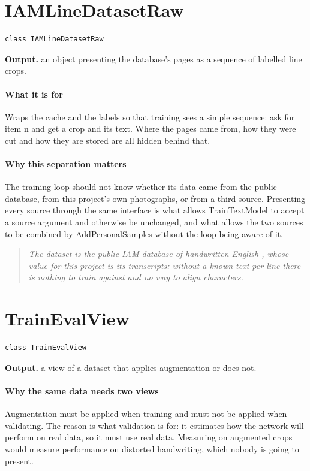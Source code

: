 \section{IAMLineDatasetRaw}
\begin{lstlisting}[style=sig]
class IAMLineDatasetRaw
\end{lstlisting}

\noindent\textbf{Output.} an object presenting the database's pages as a sequence of labelled line crops.


\paragraph{What it is for}
Wraps the cache and the labels so that training sees a simple sequence: ask for item n and get a crop and its text. Where the pages came from, how they were cut and how they are stored are all hidden behind that.


\paragraph{Why this separation matters}
The training loop should not know whether its data came from the public database, from this project's own photographs, or from a third source. Presenting every source through the same interface is what allows TrainTextModel to accept a source argument and otherwise be unchanged, and what allows the two sources to be combined by AddPersonalSamples without the loop being aware of it.


\begin{quote}\small\itshape The dataset is the public IAM database of handwritten English \cite{marti2002}, whose value for this project is its transcripts: without a known text per line there is nothing to train against and no way to align characters.\end{quote}

\section{TrainEvalView}
\begin{lstlisting}[style=sig]
class TrainEvalView
\end{lstlisting}

\noindent\textbf{Output.} a view of a dataset that applies augmentation or does not.


\paragraph{Why the same data needs two views}
Augmentation must be applied when training and must not be applied when validating. The reason is what validation is for: it estimates how the network will perform on real data, so it must use real data. Measuring on augmented crops would measure performance on distorted handwriting, which nobody is going to present.

